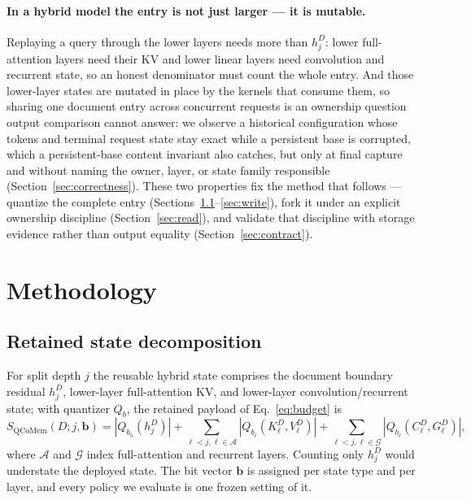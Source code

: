 \documentclass{article}
\begin{document}
\paragraph{In a hybrid model the entry is not just larger --- it is mutable.}
Replaying a query through the lower layers needs more than $h_j^D$: lower
full-attention layers need their KV and lower linear layers need convolution
and recurrent state, so an honest denominator must count the whole entry.  And
those lower-layer states are mutated in place by the kernels that consume them,
so sharing one document entry across concurrent requests is an ownership
question output comparison cannot answer: we observe a historical configuration
whose tokens and terminal request state stay exact while a persistent base is
corrupted, which a persistent-base content invariant also catches, but only at
final capture and without naming the owner, layer, or state family responsible
(Section~\ref{sec:correctness}).  These two properties fix the method that
follows --- quantize the complete entry
(Sections~\ref{sec:decomposition}--\ref{sec:write}), fork it under an explicit
ownership discipline (Section~\ref{sec:read}), and validate that discipline
with storage evidence rather than output equality
(Section~\ref{sec:contract}).

\section{Methodology}
\label{sec:method}

\subsection{Retained state decomposition}
\label{sec:decomposition}

For split depth $j$ the reusable hybrid state comprises the document boundary
residual $h_j^D$, lower-layer full-attention KV, and lower-layer
convolution/recurrent state; with quantizer $Q_b$, the retained payload of
Eq.~\ref{eq:budget} is
\begin{equation}
 S_{\mathrm{QCoMem}}(D;j,\mathbf b)=|Q_{b_h}(h_j^D)|+
 \sum_{\ell<j,\ell\in\mathcal A}|Q_{b_\ell}(K^D_\ell,V^D_\ell)|+
 \sum_{\ell<j,\ell\in\mathcal G}|Q_{b_\ell}(C^D_\ell,G^D_\ell)|,
\end{equation}
where $\mathcal A$ and $\mathcal G$ index full-attention and recurrent layers.
Counting only $h_j^D$ would understate the deployed state.  The bit vector
$\mathbf b$ is assigned per state type and per layer, and every policy we
evaluate is one frozen setting of it.
\end{document}
